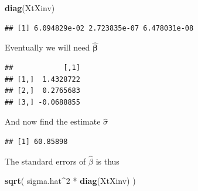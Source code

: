 \documentclass[]{book}
\newenvironment{Shaded}{\begin{snugshade}}{\end{snugshade}}
\newcommand{\KeywordTok}[1]{\textcolor[rgb]{0.13,0.29,0.53}{\textbf{{#1}}}}
\newcommand{\DecValTok}[1]{\textcolor[rgb]{0.00,0.00,0.81}{{#1}}}
\newcommand{\StringTok}[1]{\textcolor[rgb]{0.31,0.60,0.02}{{#1}}}
\newcommand{\NormalTok}[1]{{#1}}
\theoremstyle{definition}
\theoremstyle{definition}
\theoremstyle{remark}
\begin{document}
\begin{Shaded}
\begin{Highlighting}[]
\KeywordTok{diag}\NormalTok{(XtXinv)}
\end{Highlighting}
\end{Shaded}

\begin{verbatim}
## [1] 6.094829e-02 2.723835e-07 6.478031e-08
\end{verbatim}

Eventually we will need \(\hat{\boldsymbol{\beta}}\)

\begin{Shaded}
\end{Shaded}

\begin{verbatim}
##            [,1]
## [1,]  1.4328722
## [2,]  0.2765683
## [3,] -0.0688855
\end{verbatim}

And now find the estimate \(\hat{\sigma}\)

\begin{Shaded}
\end{Shaded}

\begin{verbatim}
## [1] 60.85898
\end{verbatim}

The standard errors of \(\hat{\beta}\) is thus

\begin{Shaded}
\begin{Highlighting}[]
\KeywordTok{sqrt}\NormalTok{( sigma.hat^}\DecValTok{2} \NormalTok{*}\StringTok{ }\KeywordTok{diag}\NormalTok{(XtXinv) )}
\end{Highlighting}
\end{Shaded}
\end{document}
